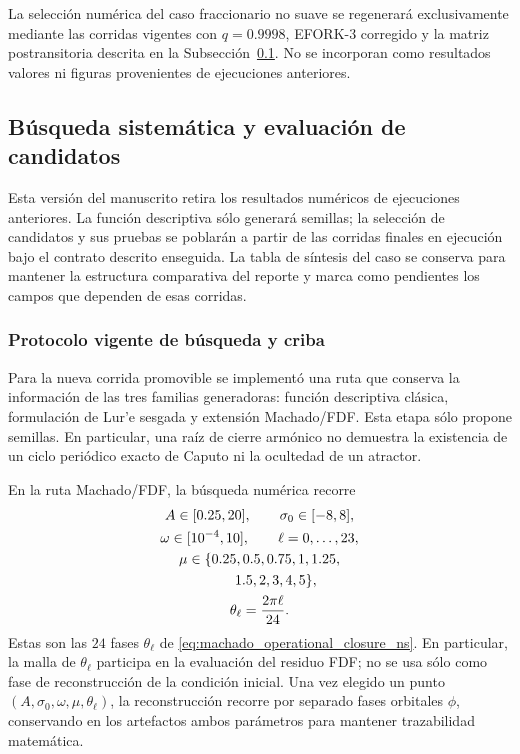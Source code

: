 \documentclass[journal]{IEEEtran}
\begin{document}
La selección numérica del caso fraccionario no suave se regenerará
exclusivamente mediante las corridas vigentes con \(q=0.9998\), EFORK-3
corregido y la matriz postransitoria descrita en la
Subsección~\ref{subsec:busqueda_sistematica_ns}. No se incorporan como
resultados valores ni figuras provenientes de ejecuciones anteriores.

\subsection{Búsqueda sistemática y evaluación de candidatos}
\label{subsec:busqueda_sistematica_ns}

Esta versión del manuscrito retira los resultados numéricos de ejecuciones
anteriores. La función descriptiva sólo generará semillas; la selección de
candidatos y sus pruebas se poblarán a partir de las corridas finales en
ejecución bajo el contrato descrito enseguida. La tabla de síntesis del caso
se conserva para mantener la estructura comparativa del reporte y marca como
pendientes los campos que dependen de esas corridas.

\subsubsection{Protocolo vigente de búsqueda y criba}

Para la nueva corrida promovible se implementó una ruta que conserva la
información de las tres familias generadoras: función descriptiva clásica,
formulación de Lur'e sesgada y extensión Machado/FDF. Esta etapa sólo propone
semillas. En particular, una raíz de cierre armónico no demuestra la
existencia de un ciclo periódico exacto de Caputo ni la ocultedad de un
atractor.

En la ruta Machado/FDF, la búsqueda numérica recorre
\begin{equation}
\begin{gathered}
A\in[0.25,20],\qquad \sigma_0\in[-8,8],\\
\omega\in[10^{-4},10],\qquad \ell=0,\ldots,23,\\
\mu\in\{0.25,0.5,0.75,1,1.25,\\
\hphantom{\mu\in\{}1.5,2,3,4,5\},\\
\theta_\ell=\dfrac{2\pi\ell}{24}.
\end{gathered}
\end{equation}
Estas son las \(24\) fases \(\theta_\ell\) de
\eqref{eq:machado_operational_closure_ns}. En particular, la malla de
\(\theta_\ell\) participa en la evaluación del residuo FDF; no se usa sólo
como fase de reconstrucción de la condición inicial. Una vez elegido un
punto \((A,\sigma_0,\omega,\mu,\theta_\ell)\), la reconstrucción recorre por
separado fases orbitales \(\phi\), conservando en los artefactos ambos
parámetros para mantener trazabilidad matemática.
\end{document}
